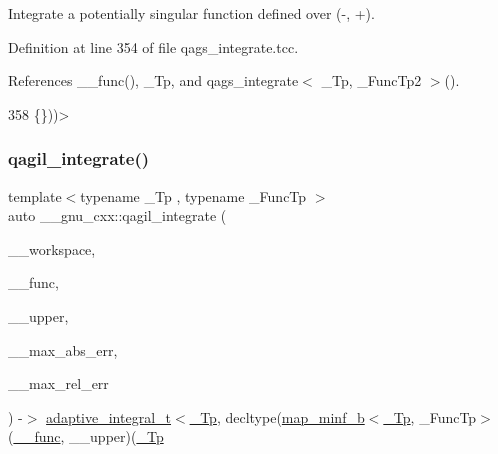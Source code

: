 Integrate a potentially singular function defined over (-\/, +). 

Definition at line 354 of file qags\+\_\+integrate.\+tcc.



References \+\_\+\+\_\+func(), \+\_\+\+Tp, and qags\+\_\+integrate$<$ \+\_\+\+Tp, \+\_\+\+Func\+Tp2 $>$().


\begin{DoxyCode}
358                                                                                 \{\}))>
\end{DoxyCode}
\mbox{\label{namespace____gnu__cxx_a1bc1539a9c0330930a7e37da72bc3d45}} 
\subsubsection{\texorpdfstring{qagil\+\_\+integrate()}{qagil\_integrate()}}
{\footnotesize\ttfamily template$<$typename \+\_\+\+Tp , typename \+\_\+\+Func\+Tp $>$ \\
auto \+\_\+\+\_\+gnu\+\_\+cxx\+::qagil\+\_\+integrate (\begin{DoxyParamCaption}\item[{\hyperlink{class____gnu__cxx_1_1integration__workspace}{integration\+\_\+workspace}$<$ \hyperlink{namespace____gnu__cxx_a3b19a9c800ca194374ef9172290f7d79}{\+\_\+\+Tp}, std\+::invoke\+\_\+result\+\_\+t$<$ \+\_\+\+Func\+Tp, \hyperlink{namespace____gnu__cxx_a3b19a9c800ca194374ef9172290f7d79}{\+\_\+\+Tp} $>$$>$ \&}]{\+\_\+\+\_\+workspace,  }\item[{\+\_\+\+Func\+Tp}]{\+\_\+\+\_\+func,  }\item[{\hyperlink{namespace____gnu__cxx_a3b19a9c800ca194374ef9172290f7d79}{\+\_\+\+Tp}}]{\+\_\+\+\_\+upper,  }\item[{\hyperlink{namespace____gnu__cxx_a3b19a9c800ca194374ef9172290f7d79}{\+\_\+\+Tp}}]{\+\_\+\+\_\+max\+\_\+abs\+\_\+err,  }\item[{\hyperlink{namespace____gnu__cxx_a3b19a9c800ca194374ef9172290f7d79}{\+\_\+\+Tp}}]{\+\_\+\+\_\+max\+\_\+rel\+\_\+err }\end{DoxyParamCaption}) -\/$>$ \hyperlink{struct____gnu__cxx_1_1adaptive__integral__t}{adaptive\+\_\+integral\+\_\+t}$<$\hyperlink{namespace____gnu__cxx_a3b19a9c800ca194374ef9172290f7d79}{\+\_\+\+Tp}, decltype(\hyperlink{struct____gnu__cxx_1_1map__minf__b}{map\+\_\+minf\+\_\+b}$<$\hyperlink{namespace____gnu__cxx_a3b19a9c800ca194374ef9172290f7d79}{\+\_\+\+Tp}, \+\_\+\+Func\+Tp$>$(\hyperlink{namespace____gnu__cxx_af2b2f0c7a2ae72b922b1afefae5a65b2}{\+\_\+\+\_\+func}, \+\_\+\+\_\+upper)(\hyperlink{namespace____gnu__cxx_a3b19a9c800ca194374ef9172290f7d79}{\+\_\+\+Tp}}

